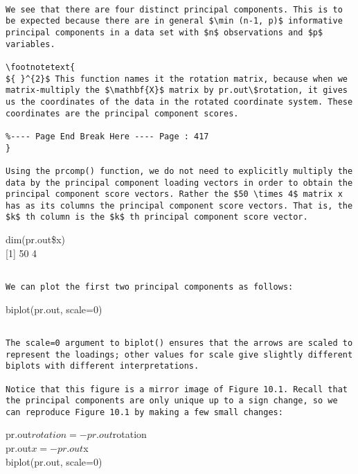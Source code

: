 \documentclass[10pt]{article}
\let\svthefootnote\thefootnote
\newcommand\blfootnotetext[1]{%
  \let\thefootnote\relax\footnote{#1}%
  \addtocounter{footnote}{-1}%
  \let\thefootnote\svthefootnote%
}
\let\svfootnotetext\footnotetext
\renewcommand\footnotetext[2][?]{%
  \if\relax#1\relax%
    \ifnum\value{footnote}=0\blfootnotetext{#2}\else\svfootnotetext{#2}\fi%
  \else%
    \if?#1\ifnum\value{footnote}=0\blfootnotetext{#2}\else\svfootnotetext{#2}\fi%
    \else\svfootnotetext[#1]{#2}\fi%
  \fi
}
\begin{document}
\begin{verbatim}

We see that there are four distinct principal components. This is to be expected because there are in general $\min (n-1, p)$ informative principal components in a data set with $n$ observations and $p$ variables.

\footnotetext{
${ }^{2}$ This function names it the rotation matrix, because when we matrix-multiply the $\mathbf{X}$ matrix by pr.out\$rotation, it gives us the coordinates of the data in the rotated coordinate system. These coordinates are the principal component scores.

%---- Page End Break Here ---- Page : 417
}

Using the prcomp() function, we do not need to explicitly multiply the data by the principal component loading vectors in order to obtain the principal component score vectors. Rather the $50 \times 4$ matrix x has as its columns the principal component score vectors. That is, the $k$ th column is the $k$ th principal component score vector.
\end{verbatim}

\begin{displayquote}
dim(pr.out\$x)\\[0pt]
[1] 50 4
\end{displayquote}

\begin{verbatim}

We can plot the first two principal components as follows:
\end{verbatim}

\begin{displayquote}
biplot(pr.out, scale=0)
\end{displayquote}

\begin{verbatim}

The scale=0 argument to biplot() ensures that the arrows are scaled to represent the loadings; other values for scale give slightly different biplots with different interpretations.

Notice that this figure is a mirror image of Figure 10.1. Recall that the principal components are only unique up to a sign change, so we can reproduce Figure 10.1 by making a few small changes:
\end{verbatim}

\begin{displayquote}
pr.out$rotation=-pr.out$rotation\\
pr.out$x=-pr.out$x\\
biplot(pr.out, scale=0)
\end{displayquote}
\end{document}
